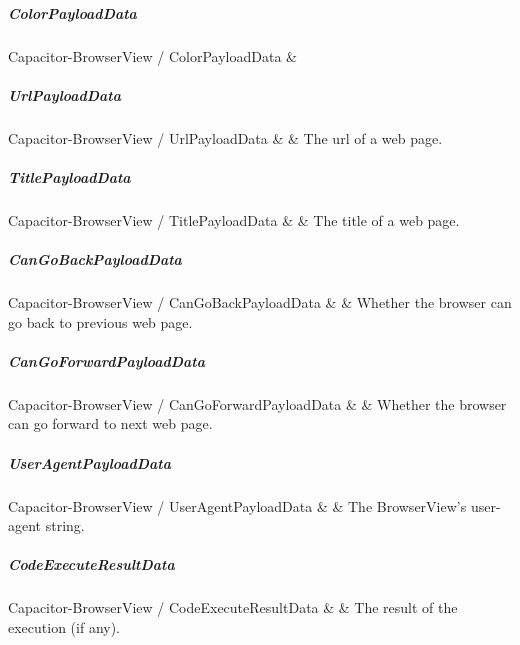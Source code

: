 \subparagraph{ColorPayloadData}

\begin{interface}{Capacitor-BrowserView / ColorPayloadData}
   &  \\ \hline
\end{interface}

\subparagraph{UrlPayloadData}

\begin{interfacedesc}{Capacitor-BrowserView / UrlPayloadData}
   &  & The \ac{url} of a web page. \\ \hline
\end{interfacedesc}

\subparagraph{TitlePayloadData}

\begin{interfacedesc}{Capacitor-BrowserView / TitlePayloadData}
   &  & The title of a web page. \\ \hline
\end{interfacedesc}

\subparagraph{CanGoBackPayloadData}

\begin{interfacedesc}{Capacitor-BrowserView / CanGoBackPayloadData}
   &  & Whether the browser can go back to previous web page. \\ \hline
\end{interfacedesc}

\subparagraph{CanGoForwardPayloadData}

\begin{interfacedesc}{Capacitor-BrowserView / CanGoForwardPayloadData}
   &  & Whether the browser can go forward to next web page. \\ \hline
\end{interfacedesc}

\subparagraph{UserAgentPayloadData}

\begin{interfacedesc}{Capacitor-BrowserView / UserAgentPayloadData}
   &  & The BrowserView's user-agent string. \\ \hline
\end{interfacedesc}

\subparagraph{CodeExecuteResultData}

\begin{interfacedesc}{Capacitor-BrowserView / CodeExecuteResultData}
   &  & The result of the execution (if any). \\ \hline
\end{interfacedesc}

